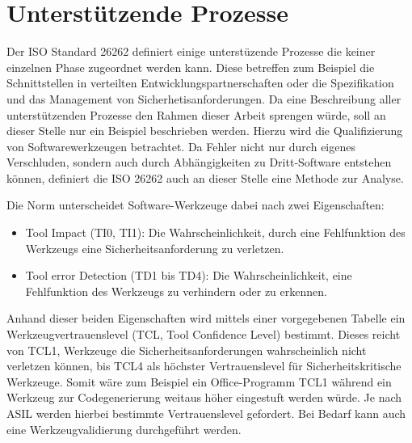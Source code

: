\documentclass[a4paper,DIV=calc,ngerman]{scrartcl}
\begin{document}
\section{Unterstützende Prozesse}
\label{sec:prozesse}
Der ISO Standard 26262 definiert einige unterstüzende Prozesse die keiner einzelnen Phase zugeordnet werden kann. Diese betreffen zum Beispiel die Schnittstellen in verteilten Entwicklungspartnerschaften oder die Spezifikation und das Management von Sicherhetisanforderungen. Da eine Beschreibung aller unterstützenden Prozesse den Rahmen dieser Arbeit sprengen würde, soll an dieser Stelle nur ein Beispiel beschrieben werden. Hierzu wird die Qualifizierung von Softwarewerkzeugen betrachtet. Da Fehler nicht nur durch eigenes Verschluden, sondern auch durch Abhängigkeiten zu Dritt-Software entstehen können, definiert die ISO 26262 auch an dieser Stelle eine Methode zur Analyse.

Die Norm unterscheidet Software-Werkzeuge dabei nach zwei Eigenschaften:

\begin{itemize}
    \item Tool Impact (TI0, TI1): Die Wahrscheinlichkeit, durch eine Fehlfunktion des Werkzeugs eine Sicherheitsanforderung zu verletzen.
    \item Tool error Detection (TD1 bis TD4): Die Wahrscheinlichkeit, eine Fehlfunktion des Werkzeugs zu verhindern oder zu erkennen.
\end{itemize}

Anhand dieser beiden Eigenschaften wird mittels einer vorgegebenen Tabelle ein Werkzeugvertrauenslevel (TCL, Tool Confidence Level) bestimmt. Dieses reicht von TCL1, Werkzeuge die Sicherheitsanforderungen wahrscheinlich nicht verletzen können, bis TCL4 als höchster Vertrauenslevel für Sicherheitskritische Werkzeuge. Somit wäre zum Beispiel ein Office-Programm TCL1 während ein Werkzeug zur Codegenerierung weitaus höher eingestuft werden würde. Je nach ASIL werden hierbei bestimmte Vertrauenslevel gefordert. Bei Bedarf kann auch eine Werkzeugvalidierung durchgeführt werden.





\end{document}
